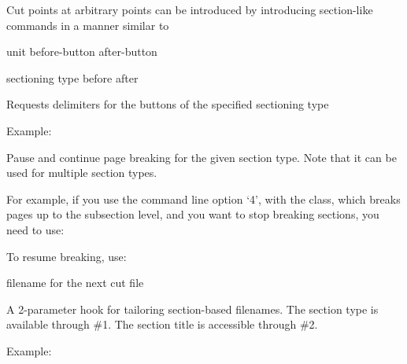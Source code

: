 Cut points at arbitrary points can be introduced by introducing section-like
commands in a manner similar to

\begin{texsource}
\NewSection\mysection{}
\end{texsource}

 {unit} {before-button} {after-button}\EndDoc

{sectioning type}
{before}
{after}\EndDoc

Requests delimiters for the  buttons of the specified
     sectioning type

Example:   

\begin{texsource}
\end{texsource}


Pause and continue page breaking for the given section type. Note that it can be used for multiple section types. 

For example, if you use the command line option `4', with the 
class, which breaks pages up to the subsection level, and you want to stop
breaking sections, you need to use:

\begin{texsource}
\end{texsource}

To resume breaking, use:

\begin{texsource}
\end{texsource}

 {filename for the next cut file}\EndDoc

   A 2-parameter hook for tailoring section-based filenames.
   The section type is available through \#1. The section title
   is accessible through \#2.

Example:

\begin{texsource}
\end{texsource}



